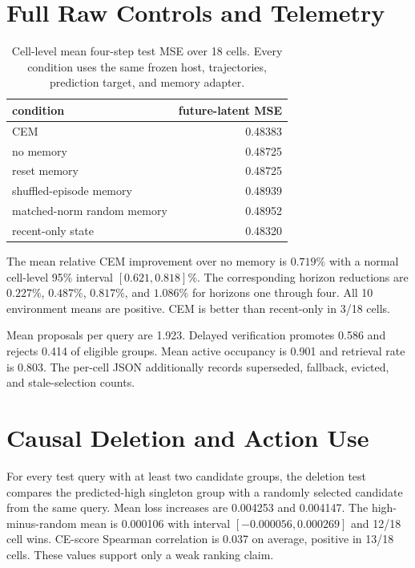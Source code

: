 \section{Full Raw Controls and Telemetry}
\label{app:raw-controls}

\begin{table}[h]
\centering\scriptsize
\caption{Cell-level mean four-step test MSE over 18 cells. Every condition uses
the same frozen host, trajectories, prediction target, and memory adapter.}
\label{tab:raw-controls}
\begin{tabular}{lr}
\toprule
condition & future-latent MSE\\
\midrule
CEM & 0.48383\\
no memory & 0.48725\\
reset memory & 0.48725\\
shuffled-episode memory & 0.48939\\
matched-norm random memory & 0.48952\\
recent-only state & 0.48320\\
\bottomrule
\end{tabular}
\end{table}

The mean relative CEM improvement over no memory is $0.719\%$ with a normal
cell-level 95\% interval $[0.621,0.818]\%$. The corresponding horizon
reductions are $0.227\%$, $0.487\%$, $0.817\%$, and $1.086\%$ for horizons
one through four. All 10 environment means are positive. CEM is better than
recent-only in 3/18 cells.

Mean proposals per query are 1.923. Delayed verification promotes 0.586 and
rejects 0.414 of eligible groups. Mean active occupancy is 0.901 and retrieval
rate is 0.803. The per-cell JSON additionally records superseded, fallback,
evicted, and stale-selection counts.

\section{Causal Deletion and Action Use}
\label{app:raw-use}

For every test query with at least two candidate groups, the deletion test
compares the predicted-high singleton group with a randomly selected candidate
from the same query. Mean loss increases are 0.004253 and 0.004147. The
high-minus-random mean is 0.000106 with interval
$[-0.000056,0.000269]$ and 12/18 cell wins. CE-score Spearman correlation is
0.037 on average, positive in 13/18 cells. These values support only a weak
ranking claim.

